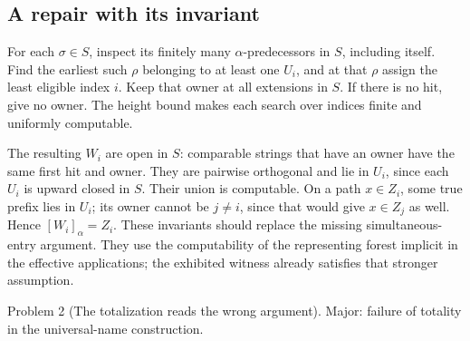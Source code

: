 \documentclass[10pt]{article}
\begin{document}
\subsection*{A repair with its invariant}
For each \(\sigma\in S\), inspect its finitely many \(\alpha\)-predecessors in \(S\), including itself. Find the earliest such \(\rho\) belonging to at least one \(U_i\), and at that \(\rho\) assign the least eligible index \(i\). Keep that owner at all extensions in \(S\). If there is no hit, give no owner. The height bound makes each search over indices finite and uniformly computable.\par
The resulting \(W_i\) are open in \(S\): comparable strings that have an owner have the same first hit and owner. They are pairwise orthogonal and lie in \(U_i\), since each \(U_i\) is upward closed in \(S\). Their union is computable. On a path \(x\in Z_i\), some true prefix lies in \(U_i\); its owner cannot be \(j\ne i\), since that would give \(x\in Z_j\) as well. Hence \([W_i]_\alpha=Z_i\). These invariants should replace the missing simultaneous-entry argument. They use the computability of the representing forest implicit in the effective applications; the exhibited witness already satisfies that stronger assumption.\par
Problem 2 (The totalization reads the wrong argument).  Major: failure of totality in the universal-name construction.\par
\end{document}
